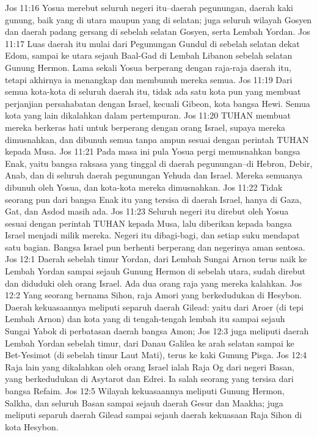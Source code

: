 Jos 11:16  Yosua merebut seluruh negeri itu--daerah pegunungan, daerah kaki gunung, baik yang di utara maupun yang di selatan; juga seluruh wilayah Gosyen dan daerah padang gersang di sebelah selatan Gosyen, serta Lembah Yordan.
Jos 11:17  Luas daerah itu mulai dari Pegunungan Gundul di sebelah selatan dekat Edom, sampai ke utara sejauh Baal-Gad di Lembah Libanon sebelah selatan Gunung Hermon. Lama sekali Yosua berperang dengan raja-raja daerah itu, tetapi akhirnya ia menangkap dan membunuh mereka semua.
Jos 11:19  Dari semua kota-kota di seluruh daerah itu, tidak ada satu kota pun yang membuat perjanjian persahabatan dengan Israel, kecuali Gibeon, kota bangsa Hewi. Semua kota yang lain dikalahkan dalam pertempuran.
Jos 11:20  TUHAN membuat mereka berkeras hati untuk berperang dengan orang Israel, supaya mereka dimusnahkan, dan dibunuh semua tanpa ampun sesuai dengan perintah TUHAN kepada Musa.
Jos 11:21  Pada masa ini pula Yosua pergi memusnahkan bangsa Enak, yaitu bangsa raksasa yang tinggal di daerah pegunungan--di Hebron, Debir, Anab, dan di seluruh daerah pegunungan Yehuda dan Israel. Mereka semuanya dibunuh oleh Yosua, dan kota-kota mereka dimusnahkan.
Jos 11:22  Tidak seorang pun dari bangsa Enak itu yang tersisa di daerah Israel, hanya di Gaza, Gat, dan Asdod masih ada.
Jos 11:23  Seluruh negeri itu direbut oleh Yosua sesuai dengan perintah TUHAN kepada Musa, lalu diberikan kepada bangsa Israel menjadi milik mereka. Negeri itu dibagi-bagi, dan setiap suku mendapat satu bagian. Bangsa Israel pun berhenti berperang dan negerinya aman sentosa.
Jos 12:1  Daerah sebelah timur Yordan, dari Lembah Sungai Arnon terus naik ke Lembah Yordan sampai sejauh Gunung Hermon di sebelah utara, sudah direbut dan diduduki oleh orang Israel. Ada dua orang raja yang mereka kalahkan.
Jos 12:2  Yang seorang bernama Sihon, raja Amori yang berkedudukan di Hesybon. Daerah kekuasaannya meliputi separuh daerah Gilead: yaitu dari Aroer (di tepi Lembah Arnon) dan kota yang di tengah-tengah lembah itu sampai sejauh Sungai Yabok di perbatasan daerah bangsa Amon;
Jos 12:3  juga meliputi daerah Lembah Yordan sebelah timur, dari Danau Galilea ke arah selatan sampai ke Bet-Yesimot (di sebelah timur Laut Mati), terus ke kaki Gunung Pisga.
Jos 12:4  Raja lain yang dikalahkan oleh orang Israel ialah Raja Og dari negeri Basan, yang berkedudukan di Asytarot dan Edrei. Ia salah seorang yang tersisa dari bangsa Refaim.
Jos 12:5  Wilayah kekuasaannya meliputi Gunung Hermon, Salkha, dan seluruh Basan sampai sejauh daerah Gesur dan Maakha; juga meliputi separuh daerah Gilead sampai sejauh daerah kekuasaan Raja Sihon di kota Hesybon.
